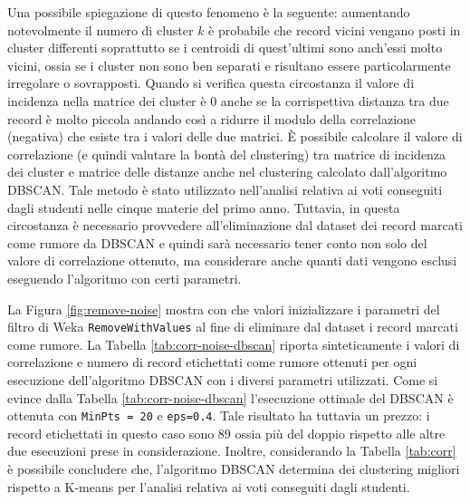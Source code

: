 \documentclass[12pt]{article}
\begin{document}
Una possibile spiegazione di questo fenomeno è la seguente: aumen\-tando notevolmente il numero di cluster $k$ è probabile che record vicini vengano posti in cluster differenti soprattutto se i centroidi di quest'ultimi sono anch'essi molto vicini, ossia se i cluster non sono ben separati e risulta\-no essere particolarmente irregolare o sovrapposti. 
Quando si verifica questa circostanza il valore di incidenza nella matrice dei cluster è $0$ anche se la corrispettiva distanza tra due record è molto piccola andando così a ridurre il modulo della correlazione (negativa) che esiste tra i valori delle due matrici. 
È possibile calcolare il valore di correlazione (e quindi valutare la bontà del cluste\-ring) tra matrice di incidenza dei cluster e matrice delle distanze anche nel clustering calcolato dall'algoritmo DBSCAN. 
Tale metodo è stato utilizza\-to nell'analisi relativa ai voti conseguiti dagli studenti nelle cinque materie del primo anno. 
Tuttavia, in questa circostanza è necessario provvedere all'eliminazione dal dataset dei record marcati come rumore da DBSCAN e quindi sarà necessario tener conto non solo del valore di correlazione ottenuto, ma considerare anche quanti dati vengono esclusi eseguendo l'algoritmo con certi parametri. 

La Figura \ref{fig:remove-noise} mostra con che valori inizializzare i parametri del filtro di Weka \texttt{RemoveWithValues} al fine di eliminare dal dataset i record marcati come rumore. La Tabella \ref{tab:corr-noise-dbscan} riporta sinteticamente i valori di correlazione e numero di record etichettati come rumore ottenuti per ogni esecuzione dell'algoritmo DBSCAN con i diversi parametri utilizzati. Come si evince dalla Tabella \ref{tab:corr-noise-dbscan} l'esecuzione ottimale del DBSCAN è ottenuta con \texttt{MinPts = 20} e \texttt{eps=0.4}. Tale risultato ha tuttavia un prezzo: i record etichettati in questo caso sono $89$ ossia più del doppio rispetto alle altre due esecuzioni prese in considerazione. Inoltre, considerando la Tabella \ref{tab:corr} è possibile concludere che, l'algoritmo DBSCAN determina dei clustering migliori rispetto a K-means per l'analisi relativa ai voti conseguiti dagli studenti.
\end{document}
